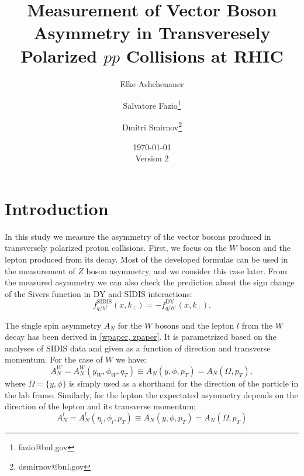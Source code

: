 \documentclass[12pt]{article}
\begin{document}
\setcounter{section}{0}
\setcounter{subsection}{0}
\setcounter{equation}{0}
\setcounter{figure}{0}
\setcounter{footnote}{0}
\setcounter{table}{0}


\title{Measurement of Vector Boson Asymmetry in Transveresely Polarized $pp$
Collisions at RHIC}

\author{Elke Ashchenauer}
\author{Salvatore Fazio\thanks{fazio@bnl.gov}}
\author{Dmitri Smirnov\thanks{dsmirnov@bnl.gov}}


\date{\today\\[1em]Version 2}

\maketitle

\newpage

\tableofcontents 

\newpage

\section{Introduction}

In this study we measure the asymmetry of the vector bosons produced in
transversely polarized proton collisions. First, we focus on the $W$ boson and
the lepton produced from its decay. Most of the developed formulae can be used
in the measurement of $Z$ boson asymmetry, and we consider this case later.
From the measured asymmetry we can also check the prediction about the sign
change of the Sivers function in DY and SIDIS interactions:
%
\begin{equation}
f^\text{SIDIS}_{q/h^\uparrow} (x, k_\perp) = - f^\text{DY}_{q/h^\uparrow} (x, k_\perp).
\end{equation}

The single spin asymmetry $A_N$ for the $W$ bosons and the lepton $l$ from the
$W$ decay has been derived in \ref{wpaper, zpaper}. It is parametrized based on
the analyses of SIDIS data and given as a function of direction and transverse
momentum. For the case of $W$ we have:
%
\begin{equation}
A^W_N = A^W_N(y_W, \phi_W, q_T) \equiv A_N(y, \phi, p_T) = A_N(\Omega, p_T),
\label{eq:asym_wboson}
\end{equation}
%
where $\Omega = \{y, \phi\}$ is simply used as a shorthand for the direction of
the particle in the lab frame. Similarly, for the lepton the expectated
asymmetry depends on the direction of the lepton and its transverse momentum:
%
\begin{equation}
A^l_N = A^l_N(\eta_l, \phi_l, p_T) \equiv A_N(y, \phi, p_T) = A_N(\Omega, p_T)
\label{eq:asym_lepton}
\end{equation}
\end{document}
